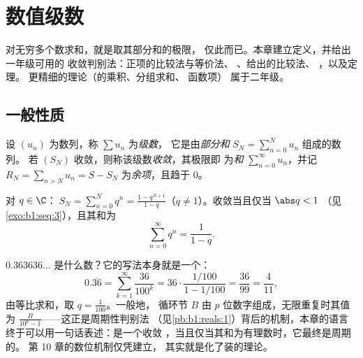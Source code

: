 \chapter{数值级数}\label{ch:b1:series}

对无穷多个数求和，就是取其部分和的极限，
仅此而已。本章建立定义，并给出一年级可用的
收敛判别法：正项的比较法与等价法、
、给出的比较法、
，以及定理。
更精细的理论（的乘积、分组求和、
函数项）
属于二年级。

\section{一般性质}

\begin{definition}\label{def:b1:series:def}
设 $(u_n)$ 为数列，称 $\sum u_n$ 为\emph{级数}，
它是由\emph{部分和} $S_N = \sum_{n=0}^{N} u_n$ 组成的数列。
若 $(S_N)$ 收敛，则称该级数\emph{收敛}，其极限即
为\emph{和} $\sum_{n=0}^{\infty} u_n$，并记 $R_N = \sum_{n > N} u_n =
S - S_N$ 为\emph{余项}，且趋于 $0$。
\end{definition}

\begin{example}[等比级数]\label{ex:b1:series:geometric}
对 $q \in \C$：$\;S_N = \sum_{n=0}^{N} q^n = \frac{1 -
q^{N+1}}{1-q}$（$q \neq 1$）。收敛当且仅当 $\abs q < 1$
（见\cref{exo:b1:seq:3}），且其和为
\[
\sum_{n=0}^{\infty} q^n = \frac{1}{1 - q} .
\]
\end{example}

\begin{example}[循环小数是等比级数]\label{ex:b1:series:periodicdecimal}
$0.363636\dots$ 是什么数？它的写法本身就是一个：
\[
0.\overline{36} = \sum_{k=1}^{\infty} \frac{36}{100^k}
= 36\cdot\frac{1/100}{1 - 1/100} = \frac{36}{99} =
\frac{4}{11} ,
\]
由等比求和，取 $q = \frac{1}{100}$。一般地，
循环节 $B$ 由 $p$ 位数字组成，无限重复时其值为
$\frac{B}{10^p - 1}$——这正是周期性判别法
（见\cref{pb:b1:reals:1}）背后的机制，本章的语言
终于可以用一句话表述：是一个收敛
，当且仅当其和为有理数时，它最终是周期的。
第 10 章的数位机制仅凭建立，
其实就是化了装的理论。
\end{example}

